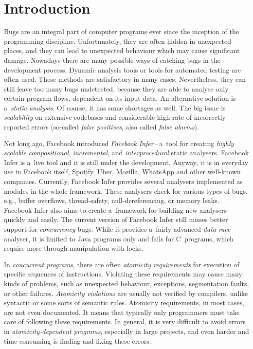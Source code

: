 

\chapter{Introduction}

Bugs are an integral part of computer programs ever since the inception
of the programming discipline. Unfortunately, they are often hidden
in unexpected places, and they can lead to unexpected behaviour which
may cause significant damage. Nowadays there are many possible
ways of catching bugs in the development process. Dynamic analysis
tools or tools for automated testing are often used. These methods
are satisfactory in many cases. Nevertheless, they can still leave
too many bugs undetected, because they are able to analyse only
certain program flows, dependent on its input data. An alternative
solution is a~\emph{static analysis}. Of course, it has some shortages
as well. The big issue is \emph{scalability} on extensive codebases and
considerable high rate of incorrectly reported errors (so-called
\emph{false positives}, also called \emph{false alarms}).

Not long ago, Facebook introduced \emph{Facebook Infer}\,--\,a~tool for
creating \emph{highly scalable} \emph{compositional}, \emph{incremental},
and \emph{interprocedural} static analysers. Facebook Infer is a~live tool
and it is still under the development. Anyway, it is in everyday use in
Facebook itself, Spotify, Uber, Mozilla, WhatsApp and other well-known
companies. Currently, Facebook Infer provides several analysers implemented
as modules in the whole framework. These analysers check for various types
of bugs, e.g., buffer overflows, thread-safety, null-dereferencing, or
memory leaks. Facebook Infer also aims to create a~framework for building
new analysers quickly and easily. The current version of Facebook Infer still
misses better support for \emph{concurrency} bugs. While it provides a~fairly
advanced \emph{data race} analyser, it is limited to Java programs only and
fails for C~programs, which require more through manipulation with locks.

In \emph{concurrent programs}, there are often \emph{atomicity requirements}
for execution of specific sequences of instructions. Violating these
requirements may cause many kinds of problems, such as unexpected
behaviour, exceptions, segmentation faults, or other failures.
\emph{Atomicity violations} are usually not verified by compilers,
unlike syntactic or some sorts of semantic rules. Atomicity requirements,
in most cases, are not even documented. It means that typically only
programmers must take care of following these requirements. In general,
it is very difficult to avoid errors in \emph{atomicity-dependent
programs}, especially in large projects, and even harder and time-consuming
is finding and fixing these errors.

